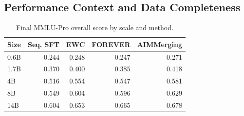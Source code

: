 \documentclass{article}
\begin{document}
\subsection{Performance Context and Data Completeness}
\label{app:performance_context}



\begin{table}[!htbp]
  \centering
  \caption{
  {Final MMLU-Pro overall score by scale and method.}
  }
  \label{tab:app_final_overall_pivot}
  \footnotesize
  \setlength{\tabcolsep}{4pt}
{
\renewcommand{\arraystretch}{1.08}
\begin{tabular}{lrrrr}
\toprule[0.9pt]
\rowcolor{sizeBand}
Size & Seq. SFT & EWC & FOREVER & AIMMerging \\
\midrule
\rowcolor{refGray} 0.6B & 0.244 & 0.248 & 0.247 & 0.271 \\
\rowcolor{mergeBlue} 1.7B & 0.370 & 0.400 & 0.385 & 0.418 \\
\rowcolor{refGray} 4B & 0.516 & 0.554 & 0.547 & 0.581 \\
\rowcolor{mergeBlue} 8B & 0.549 & 0.604 & 0.596 & 0.629 \\
\rowcolor{refGray} 14B & 0.604 & 0.653 & 0.665 & 0.678 \\
\bottomrule[0.9pt]
\end{tabular}
}

\end{table}
\end{document}
